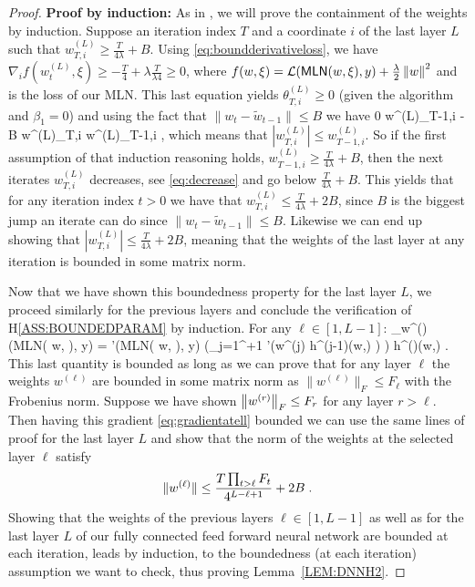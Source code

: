 \documentclass[wcp]{jmlr}
\begin{document}
\begin{proof}
\textbf{Proof by induction:} As in \citep{defossez2020convergence}, we will prove the containment of the weights by induction.
Suppose an iteration index $T$ and a coordinate $i$ of the last layer $L$ such that $w^{(L)}_{T, i} \geq \frac{T}{4\lambda} + B$.
Using \eqref{eq:boundderivativeloss}, we have $
\nabla_i f(w^{(L)}_t, \xi) \geq - \frac{T}{4} + \lambda \frac{T}{\lambda4} \geq 0 $,
where $f(w, \xi) = \mathcal{L}(\textsf{MLN}( w, \xi), y) +\frac{\lambda}{2}\norm{w}^2$ and is the loss of our MLN.
This last equation yields $\theta^{(L)}_{T,i} \geq 0$ (given the algorithm and $\beta_1 = 0$) and using the fact that $\|w_t - \tilde{w}_{t-1}\| \leq B$ we have
\beq\label{eq:decrease}
0 \leq w^{(L)}_{T-1,i} - B \leq w^{(L)}_{T,i} \leq w^{(L)}_{T-1,i} \eqsp,
\eeq
which means that $| w^{(L)}_{T,i}| \leq w^{(L)}_{T-1,i}$.
So if the first assumption of that induction reasoning holds, \ie $w^{(L)}_{T-1, i} \geq \frac{T}{4\lambda} + B$, then the next iterates $w^{(L)}_{T, i}$ decreases, see \eqref{eq:decrease} and go below $\frac{T}{4\lambda} + B$. This yields that for any iteration index $t >0$ we have that $w^{(L)}_{T, i} \leq \frac{T}{4\lambda} + 2B$,
since $B$ is the biggest jump an iterate can do since $\|w_t - \tilde{w}_{t-1}\| \leq B$.
Likewise we can end up showing that $|w^{(L)}_{T, i}| \leq \frac{T}{4\lambda} + 2B$, meaning that the weights of the last layer at any iteration is bounded in some matrix norm.

Now that we have shown this boundedness property for the last layer $L$, we proceed similarly for the previous layers and conclude the verification of H\ref{ASS:BOUNDEDPARAM} by induction.
For any $\ell \in [1, L-1]$:
\beq\label{eq:gradientatell}
\nabla_{w^{(\ell)}}  (\textsf{MLN}( w, \xi), y)  =  '(\textsf{MLN}( w, \xi), y) \left(\prod_{j=1}^{\ell+1} \sigma'\left(w^{(j)} h^{(j-1)}(w,\xi) \right) \right) h^{()}(w,\xi)  \eqsp.
\eeq
This last quantity is bounded as long as we can prove that for any layer $\ell$ the weights $w^{(\ell)}$ are bounded in some matrix norm as $\|w^{(\ell)}\|_{F} \leq F_\ell$ with the Frobenius norm.
Suppose we have shown $\norm{w^{(r)}}_{F} \leq F_r$ for any layer $r > \ell$. 
Then having this gradient \eqref{eq:gradientatell} bounded we can use the same lines of proof for the last layer $L$ and show that the norm of the weights at the selected layer $\ell$ satisfy
$$
\|w^{(\ell)}\| \leq \frac{T \prod_{t > \ell} F_t}{4^{L-\ell+1}} + 2B\eqsp.
$$
Showing that the weights of the previous layers $\ell \in [1, L-1]$ as well as for the last layer $L$ of our fully connected feed forward neural network are bounded at each iteration, leads by induction, to the boundedness (at each iteration) assumption we want to check, thus proving Lemma~\ref{LEM:DNNH2}.
\end{proof}
\end{document}
